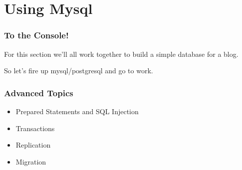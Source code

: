 \documentclass{beamer}
\begin{document}
\section{Using Mysql}

\begin{frame}
  \frametitle{To the Console!}
	For this section we'll all work together to build a simple database for a blog.

So let's fire up mysql/postgresql and go to work.
\end{frame}

\begin{frame}
  \frametitle{Advanced Topics}
  \begin{itemize}
    \item Prepared Statements and SQL Injection
    \item Transactions
    \item Replication
    \item Migration
  \end{itemize}
\end{frame}
\end{document}
